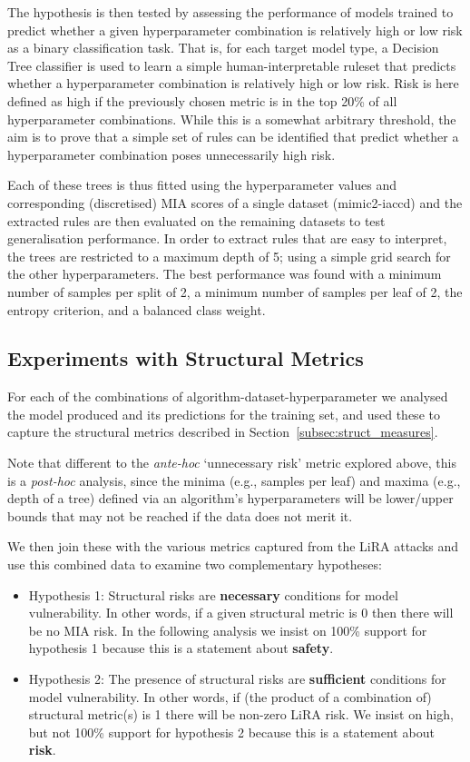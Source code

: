 The hypothesis is then tested by assessing the performance of models trained to predict whether a given hyperparameter combination is relatively high or low risk as a binary classification task. That is, for each target model type, a Decision Tree classifier is used to learn a simple human-interpretable ruleset that predicts whether a hyperparameter combination is relatively high or low risk. Risk is here defined as high if the previously chosen metric is in the top 20\% of all hyperparameter combinations. While this is a somewhat arbitrary threshold, the aim is to prove that a simple set of rules can be identified that predict whether a hyperparameter combination poses unnecessarily high risk.

Each of these trees is thus fitted using the hyperparameter values and corresponding (discretised) MIA scores of a single dataset (mimic2-iaccd) and the extracted rules are then evaluated on the remaining datasets to test generalisation performance. In order to extract rules that are easy to interpret, the trees are restricted to a maximum depth of 5; using a simple grid search for the other hyperparameters. The best performance was found with a minimum number of samples per split of 2, a minimum number of samples per leaf of 2, the entropy criterion, and a balanced class weight.

\subsection{Experiments with Structural Metrics}%
\label{sec:method_structural}

For each of the combinations of algorithm-dataset-hyperparameter we analysed the model produced and its predictions for the training set, and used these to capture the structural metrics described in Section~\ref{subsec:struct_measures}. 

Note that different to the \textit{ante-hoc} `unnecessary risk' metric explored above, this is a \textit{post-hoc} analysis, since the minima (e.g., samples per leaf) and maxima (e.g., depth of a tree) defined via an algorithm's hyperparameters will be lower/upper bounds that may not be reached if the data does not merit it.

We then join these with the various metrics captured from the LiRA attacks and use this combined data to examine two complementary hypotheses:

\begin{itemize}
    \item Hypothesis 1: Structural risks are \textbf{necessary} conditions for model vulnerability. In other words, if a given structural metric is 0 then there will be no MIA risk. In the following analysis we insist on 100\% support for hypothesis 1 because this is a statement about \textbf{safety}.

    \item Hypothesis 2: The presence of structural risks are \textbf{sufficient} conditions for model vulnerability. In other words, if (the product of a combination of) structural metric(s) is 1 there will be non-zero LiRA risk. We insist on high, but not 100\% support for hypothesis 2 because this is a statement about \textbf{risk}.
\end{itemize}
